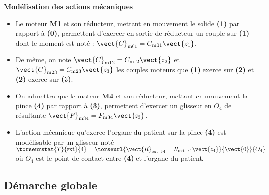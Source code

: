 \noindent\textbf{Modélisation des actions mécaniques}
\begin{itemize}
\item Le moteur \textbf{M1} et son réducteur, mettant en mouvement le solide \textbf{(1)} par rapport à \textbf{(0)}, permettent d’exercer en sortie de réducteur un couple sur \textbf{(1)} dont le moment est noté : $\vect{C}_{\text{m01}}=C_{\text{m01}}\vect{z_1}$.
\item De même, on note $\vect{C}_{\text{m12}}=C_{\text{m12}}\vect{z_2}$ et $\vect{C}_{\text{m23}}=C_{\text{m23}}\vect{z_3}$ les couples moteurs que \textbf{(1)} exerce sur \textbf{(2)} et \textbf{(2)} exerce sur \textbf{(3)}. 

\item On admettra que le moteur \textbf{M4} et son réducteur, mettant en mouvement la pince \textbf{(4)} par rapport à \textbf{(3)}, permettent d’exercer un glisseur en $O_4$ de résultante
$\vect{F}_{\text{m34}}=F_{\text{m34}}\vect{z_3}$.
\item L’action mécanique qu’exerce l’organe du patient sur la pince \textbf{(4)} est modélisable par un glisseur noté $\torseurstat{T}{\text{ext}}{4}=\torseurl{\vect{R}_{\text{ext}\to 4}=R_{\text{ext}\to 4}\vect{z_4}}{\vect{0}}{O_4}$ où $O_4$ est le point de contact entre \textbf{(4)} et l'organe du patient. 
\end{itemize}

\fi
\subsection*{Démarche globale}


